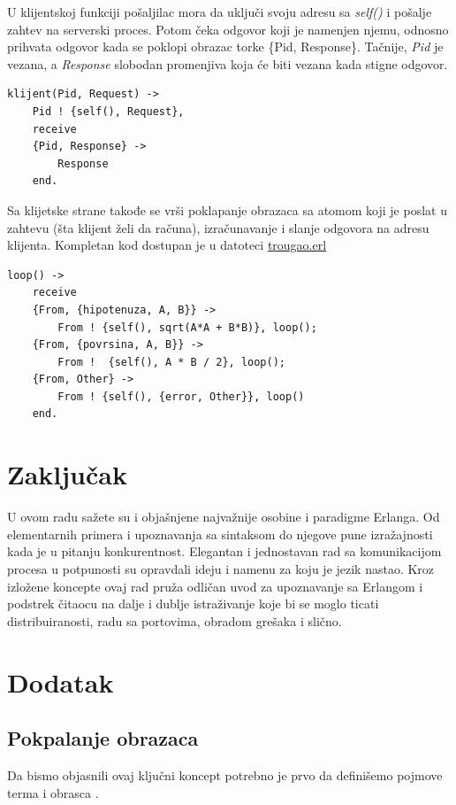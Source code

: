 \documentclass[a4paper]{article}
\begin{document}
{U klijentskoj funkciji pošaljilac mora da uključi svoju adresu sa {\em self()} i pošalje zahtev na serverski proces.
Potom čeka odgovor koji je namenjen njemu, odnosno prihvata odgovor kada se poklopi obrazac torke \{Pid, Response\}. Tačnije, {\em Pid} je vezana, a {\em Response} slobodan promenjiva koja će biti vezana kada stigne odgovor.
\begin{verbatim}
klijent(Pid, Request) ->
    Pid ! {self(), Request},
    receive
	{Pid, Response} ->
	    Response
    end.
\end{verbatim}

Sa klijetske strane takođe se vrši poklapanje obrazaca sa atomom koji je poslat u zahtevu (šta klijent želi da računa), 
izračunavanje i slanje odgovora na adresu klijenta.
Kompletan kod dostupan je u datoteci \href{https://raw.githubusercontent.com/mrdakj/msnr/master/trougao.erl}{trougao.erl}
\begin{verbatim}
loop() ->
    receive
	{From, {hipotenuza, A, B}} -> 
	    From ! {self(), sqrt(A*A + B*B)}, loop();
	{From, {povrsina, A, B}} -> 
	    From !  {self(), A * B / 2}, loop();
	{From, Other} ->
	    From ! {self(), {error, Other}}, loop()
    end.
\end{verbatim}

\section{Zaključak}
\label{sec:zakljucak}
U ovom radu sažete su i objašnjene najvažnije osobine i paradigme Erlanga. 
Od elementarnih primera i upoznavanja sa sintaksom do njegove pune izražajnosti
kada je u pitanju konkurentnost. 
Elegantan i jednostavan rad sa komunikacijom procesa u potpunosti su opravdali ideju i namenu za koju je jezik nastao.
Kroz izložene koncepte ovaj rad pruža odličan uvod za upoznavanje sa Erlangom i podstrek čitaocu na dalje i dublje istraživanje koje bi se moglo ticati distribuiranosti, radu sa portovima, obradom grešaka i slično.


\appendix
 


\newpage
\appendix
\section{Dodatak}

\subsection{Pokpalanje obrazaca}
\label{sec:poklapanje_obrazaca_formalno}
Da bismo objasnili ovaj ključni koncept potrebno je prvo da definišemo pojmove terma i obrasca \cite{phdthesis}.

}
\end{document}
